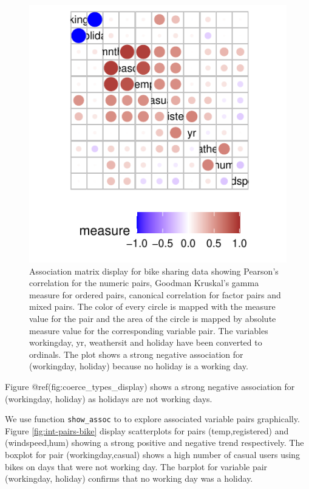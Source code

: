 \begin{figure}

{\centering \includegraphics{rjpaperCHMar22_files/figure-latex/coerceTypes-1} 

}

\caption{Association matrix display for bike sharing data showing Pearson's correlation for the numeric pairs, Goodman Kruskal's gamma measure for ordered pairs, canonical correlation for factor pairs and mixed pairs. The color of every circle is mapped with the measure value for the pair and the area of the circle is mapped by absolute measure value for the corresponding variable pair. The variables workingday, yr, weathersit and holiday have been converted to ordinals. The plot shows a strong negative association for (workingday, holiday) because no holiday is a working day.}\label{fig:coerceTypes}
\end{figure}

Figure @ref(fig:coerce\_types\_display) shows a strong negative association for (workingday, holiday) as holidays are not working days.

We use function \texttt{show\_assoc} to to explore associated variable pairs graphically. Figure \ref{fig:int-pairs-bike} display scatterplots for pairs (temp,registered) and (windspeed,hum) showing a strong positive and negative trend respectively. The boxplot for pair (workingday,casual) shows a high number of casual users using bikes on days that were not working day. The barplot for variable pair (workingday, holiday) confirms that no working day was a holiday.

